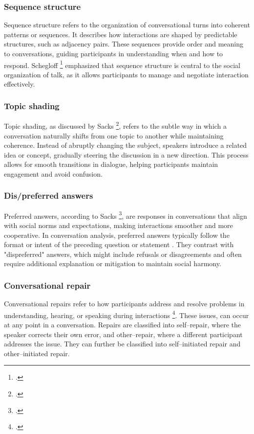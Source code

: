 \documentclass[12pt]{report}
\begin{document}
{    \subsubsection{Sequence structure}
    \par
    Sequence structure refers to the organization of conversational turns into coherent patterns or sequences. It describes how interactions are shaped by predictable structures, such as adjacency pairs. These sequences provide order and meaning to conversations, guiding participants in understanding when and how to respond. Schegloff \footcite{Schegloff1990} emphasized that sequence structure is central to the social organization of talk, as it allows participants to manage and negotiate interaction effectively.

    \subsubsection{Topic shading}
    \par
    Topic shading, as discussed by Sacks \footcite{topicshading}, refers to the subtle way in which a conversation naturally shifts from one topic to another while maintaining coherence. Instead of abruptly changing the subject, speakers introduce a related idea or concept, gradually steering the discussion in a new direction. This process allows for smooth transitions in dialogue, helping participants maintain engagement and avoid confusion.

    \subsubsection{Dis/preferred answers}
    \par
    Preferred answers, according to Sacks \footcite[p.~410]{Sacks1992}, are responses in conversations that align with social norms and expectations, making interactions smoother and more cooperative. In conversation analysis, preferred answers typically follow the format or intent of the preceding question or statement . They contrast with "dispreferred" answers, which might include refusals or disagreements and often require additional explanation or mitigation to maintain social harmony.

    \subsubsection{Conversational repair}
    \par
    Conversational repairs refer to how participants address and resolve problems in understanding, hearing, or speaking during interactions \footcite{sacksRepair}.
    These issues, can occur at any point in a conversation. Repairs are classified into self–repair, where the speaker corrects their own error, and other–repair, where a different participant addresses the issue. They can further be classified into self–initiated repair and other–initiated repair.

}
\end{document}
